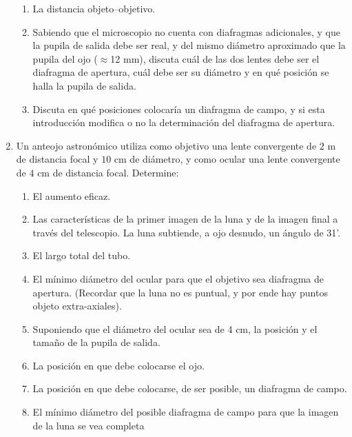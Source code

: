 \documentclass[11pt,spanish]{article}
\begin{document}
\begin{enumerate}
\begin{enumerate}
        \item La distancia objeto--objetivo.
        
        \item Sabiendo que el microscopio no cuenta con diafragmas adicionales,
        y que la pupila de salida debe ser real, y del mismo diámetro aproximado
        que la pupila del ojo ($\approx$12 mm), discuta cuál de las dos lentes
        debe ser el diafragma de apertura, cuál debe ser su diámetro y en
        qué posición se halla la pupila de salida.
        
        \item Discuta en qué posiciones colocaría un diafragma de campo, y si esta
        introducción modifica o no la determinación del diafragma de apertura.
    \end{enumerate}


    \item Un anteojo astronómico utiliza como objetivo una lente convergente
    de $2$ m de distancia focal y $10$ cm de diámetro, y como ocular una lente
    convergente de $4$ cm de distancia focal. Determine:
    \begin{enumerate}
        \item El aumento eficaz.
        \item Las características de la primer imagen de la luna y de la imagen
        final a través del telescopio. La luna subtiende, a ojo desnudo, un
        ángulo de 31'.
        
        \item El largo total del tubo.
        
        \item El mínimo diámetro del ocular para que el objetivo sea diafragma de
        apertura. (Recordar que la luna no es puntual, y por ende hay puntos
        objeto extra-axiales).
        
        \item Suponiendo que el diámetro del ocular sea de 4 cm, la posición y el
        tamaño de la pupila de salida.
        
        \item La posición en que debe colocarse el ojo.
        
        \item La posición en que debe colocarse, de ser posible, un diafragma de
        campo.
        
        \item El mínimo diámetro del posible diafragma de campo para que la imagen
        de la luna se vea completa 
    \end{enumerate}
    
\end{enumerate}
\end{document}

